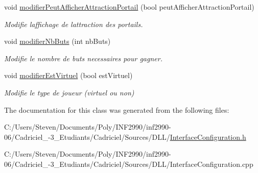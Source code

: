 \begin{DoxyCompactItemize}
void \hyperlink{group__inf2990_ga5ed1955471ea5a179b61d7f921603d26}{modifier\+Peut\+Afficher\+Attraction\+Portail} (bool peut\+Afficher\+Attraction\+Portail)
\begin{DoxyCompactList}\small\item\em Modifie l\textquotesingle{}affichage de l\textquotesingle{}attraction des portails. \end{DoxyCompactList}\item 
void \hyperlink{group__inf2990_ga570191806ecab091e74861a8a01f1ff9}{modifier\+Nb\+Buts} (int nb\+Buts)
\begin{DoxyCompactList}\small\item\em Modifie le nombre de buts necessaires pour gagner. \end{DoxyCompactList}\item 
void \hyperlink{group__inf2990_ga80f804298396f27f820928b7fb72ebfd}{modifier\+Est\+Virtuel} (bool est\+Virtuel)
\begin{DoxyCompactList}\small\item\em Modifie le type de joueur (virtuel ou non) \end{DoxyCompactList}\end{DoxyCompactItemize}


The documentation for this class was generated from the following files\+:\begin{DoxyCompactItemize}
\item 
C\+:/\+Users/\+Steven/\+Documents/\+Poly/\+I\+N\+F2990/inf2990-\/06/\+Cadriciel\+\_-\/3\+\_\+\+Etudiants/\+Cadriciel/\+Sources/\+D\+L\+L/\hyperlink{_interface_configuration_8h}{Interface\+Configuration.\+h}\item 
C\+:/\+Users/\+Steven/\+Documents/\+Poly/\+I\+N\+F2990/inf2990-\/06/\+Cadriciel\+\_-\/3\+\_\+\+Etudiants/\+Cadriciel/\+Sources/\+D\+L\+L/Interface\+Configuration.\+cpp\end{DoxyCompactItemize}
